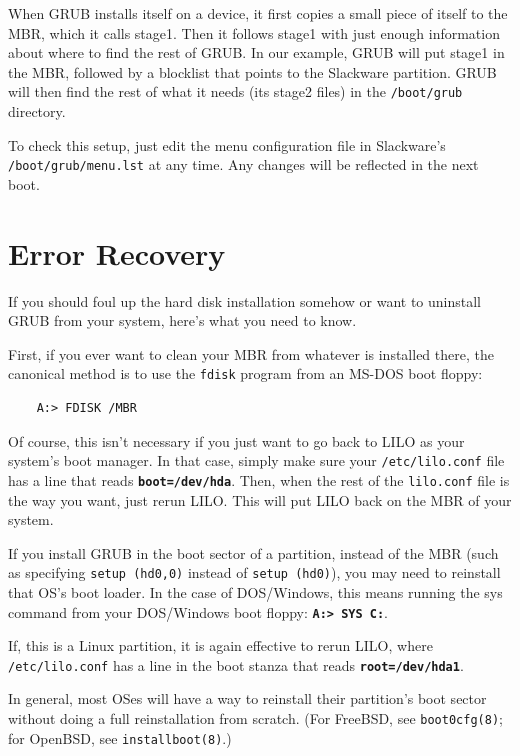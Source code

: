 \documentclass{article}
\begin{document}
When GRUB installs itself on a device, it first copies a small piece of itself to the MBR, which it calls stage1. Then it follows stage1 with just enough information about where to find the rest of GRUB. In our example, GRUB will put stage1 in the MBR, followed by a blocklist that points to the Slackware partition. GRUB will then find the rest of what it needs (its stage2 files) in the \texttt{/boot/grub} directory.

To check this setup, just edit the menu configuration file
in Slackware's \texttt{/boot/grub/menu.lst} at any time.
Any changes will be reflected in the next boot.

\section{Error Recovery}

If you should foul up the hard disk installation somehow or want to uninstall GRUB from your system, here's what you need to know.

First, if you ever want to clean your MBR from whatever is installed there, the canonical method is to use the \texttt{fdisk} program from an MS-DOS boot floppy:

\begin{verbatim}
    A:> FDISK /MBR
\end{verbatim}

Of course, this isn't necessary if you just want to go back to LILO as your system's boot manager. In that case, simply make sure your \texttt{/etc/lilo.conf} file has a line that reads \textbf{\texttt{boot=/dev/hda}}. Then, when the rest of the \texttt{lilo.conf} file is the way you want, just rerun LILO. This will put LILO back on the MBR of your system.

If you install GRUB in the boot sector of a partition, instead of the MBR (such as specifying \texttt{setup (hd0,0)} instead of \texttt{setup (hd0)}), you may need to reinstall that OS's boot loader. In the case of DOS/Windows, this means running the sys command from your DOS/Windows boot floppy: \textbf{\texttt{A:> SYS C:}}.

If, this is a Linux partition, it is again effective to rerun LILO, where \texttt{/etc/lilo.conf} has a line in the boot stanza that reads \textbf{\texttt{root=/dev/hda1}}.

In general, most OSes will have a way to reinstall their partition's boot sector without doing a full reinstallation from scratch. (For FreeBSD, see \texttt{boot0cfg(8)}; for OpenBSD, see \texttt{installboot(8)}.)
\end{document}
